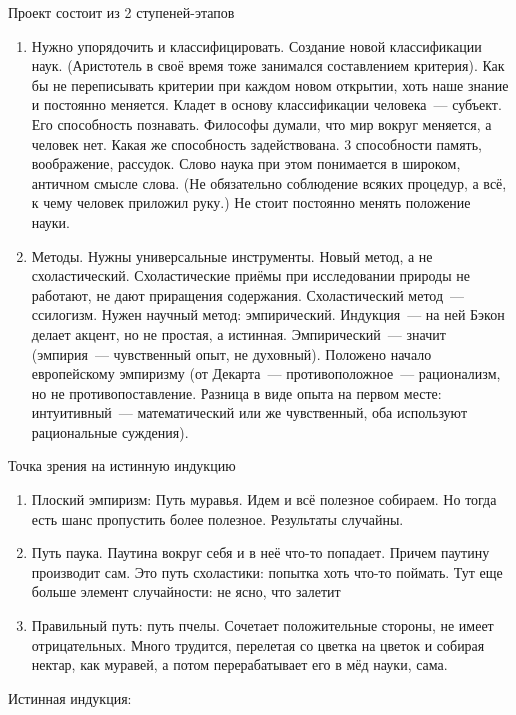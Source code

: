 Проект состоит из 2 ступеней-этапов
\begin{enumerate}
	\item Нужно упорядочить и классифицировать. Создание новой классификации наук. (Аристотель в своё время тоже занимался составлением критерия). Как бы не переписывать критерии при каждом новом открытии, хоть наше знание и постоянно меняется. Кладет в основу классификации человека~--- субъект. Его способность познавать. Философы думали, что мир вокруг меняется, а человек нет. Какая же способность задействована. 3 способности память, воображение, рассудок. Слово наука при этом понимается в широком, античном смысле слова. (Не обязательно соблюдение всяких процедур, а всё, к чему человек приложил руку.) Не стоит постоянно менять положение науки.
	\item Методы. Нужны универсальные инструменты. Новый метод, а не схоластический. Схоластические приёмы при исследовании природы не работают, не дают приращения содержания. Схоластический метод~--- ссилогизм. Нужен научный метод: эмпирический. Индукция~--- на ней Бэкон делает акцент, но не простая, а истинная. Эмпирический~--- значит (эмпирия~--- чувственный опыт, не духовный). Положено начало европейскому эмпиризму (от Декарта~--- противоположное~--- рационализм, но не противопоставление. Разница в виде опыта на первом месте: интуитивный~--- математический или же чувственный, оба используют рациональные суждения). 
\end{enumerate}

Точка зрения на истинную индукцию

\begin{enumerate}
	\item Плоский эмпиризм: Путь муравья. Идем и всё полезное собираем. Но тогда есть шанс пропустить более полезное. Результаты случайны.
	\item Путь паука. Паутина вокруг себя и в неё что-то попадает. Причем паутину производит сам. Это путь схоластики: попытка хоть что-то поймать. Тут еще больше элемент случайности: не ясно, что залетит
	\item Правильный путь: путь пчелы. Сочетает положительные стороны, не имеет отрицательных. Много трудится, перелетая со цветка на цветок и собирая нектар, как муравей, а потом перерабатывает его в мёд науки, сама. 
\end{enumerate}
Истинная индукция:

